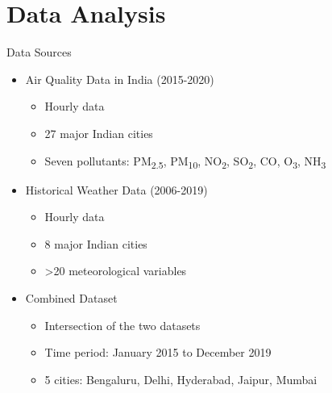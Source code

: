 \documentclass[svgnames, 12pt]{beamer}
\begin{document}
\section{Data Analysis}

\begin{frame}{Data Sources}
    \begin{itemize}
       \item Air Quality Data in India (2015-2020)
           \begin{itemize}
               \item Hourly data
               \item 27 major Indian cities
               \item Seven pollutants: PM\textsubscript{2.5}, PM\textsubscript{10}, NO\textsubscript{2}, SO\textsubscript{2}, CO, O\textsubscript{3}, NH\textsubscript{3}
           \end{itemize}
       \vspace{0.5em}
       \item Historical Weather Data (2006-2019)
           \begin{itemize}
               \item Hourly data
               \item 8 major Indian cities
               \item >20 meteorological variables
           \end{itemize}
       \vspace{0.5em}
       \item Combined Dataset
           \begin{itemize}
               \item Intersection of the two datasets
               \item Time period: January 2015 to December 2019
               \item 5 cities: Bengaluru, Delhi, Hyderabad, Jaipur, Mumbai
           \end{itemize}
    \end{itemize}
    \vfill
\end{frame}
\end{document}
